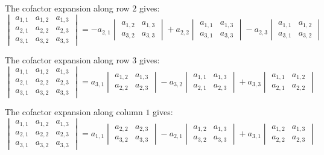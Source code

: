 \documentclass{article}
\begin{document}
The cofactor expansion along row \(2\) gives:
\[\begin{vmatrix}
a_{1,1} & a_{1,2} & a_{1,3} \\ 
a_{2,1} & a_{2,2} & a_{2,3} \\ 
a_{3,1} & a_{3,2} & a_{3,3} 
\end{vmatrix} = -a_{2,1}\begin{vmatrix}
a_{1,2} & a_{1,3} \\ 
a_{3,2} & a_{3,3} 
\end{vmatrix} + a_{2,2}\begin{vmatrix}
a_{1,1} & a_{1,3} \\ 
a_{3,1} & a_{3,3} 
\end{vmatrix} - a_{2,3}\begin{vmatrix}
a_{1,1} & a_{1,2} \\ 
a_{3,1} & a_{3,2}  
\end{vmatrix}\]

The cofactor expansion along row \(3\) gives:
\[\begin{vmatrix}
a_{1,1} & a_{1,2} & a_{1,3} \\ 
a_{2,1} & a_{2,2} & a_{2,3} \\ 
a_{3,1} & a_{3,2} & a_{3,3} 
\end{vmatrix} = a_{3,1}\begin{vmatrix}
a_{1,2} & a_{1,3} \\ 
a_{2,2} & a_{2,3} 
\end{vmatrix} - a_{3,2}\begin{vmatrix}
a_{1,1} & a_{1,3} \\ 
a_{2,1} & a_{2,3} 
\end{vmatrix} + a_{3,3}\begin{vmatrix}
a_{1,1} & a_{1,2} \\ 
a_{2,1} & a_{2,2}  
\end{vmatrix}\]

The cofactor expansion along column \(1\) gives:
\[\begin{vmatrix}
a_{1,1} & a_{1,2} & a_{1,3} \\ 
a_{2,1} & a_{2,2} & a_{2,3} \\ 
a_{3,1} & a_{3,2} & a_{3,3} 
\end{vmatrix} = a_{1,1}\begin{vmatrix}
a_{2,2} & a_{2,3} \\ 
a_{3,2} & a_{3,3} 
\end{vmatrix} - a_{2,1}\begin{vmatrix}
a_{1,2} & a_{1,3} \\ 
a_{3,2} & a_{3,3} 
\end{vmatrix} + a_{3,1}\begin{vmatrix}
a_{1,2} & a_{1,3} \\ 
a_{2,2} & a_{2,3}  
\end{vmatrix}\]
\end{document}
